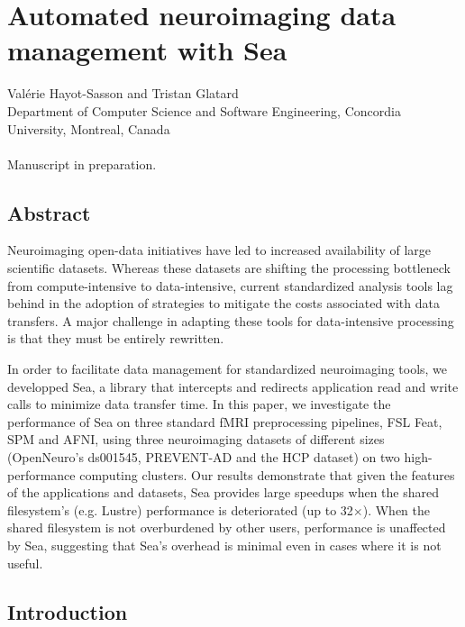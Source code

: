 \chapter{Automated neuroimaging data management with Sea}\label{chapter:sea-neuro}

Val\'erie Hayot-Sasson and Tristan Glatard \\
\begingroup \footnotesize
Department of Computer Science and Software Engineering, Concordia University, Montreal, Canada \\
\endgroup 
\vspace{5pt} \\
Manuscript in preparation. \\

\section{Abstract}

	Neuroimaging open-data initiatives have led to increased availability of large scientific datasets. 
  Whereas these datasets are shifting the processing bottleneck from compute-intensive to data-intensive,
  current standardized analysis tools lag behind in the adoption of strategies to mitigate the costs associated with
  data transfers. A major challenge in adapting these tools for data-intensive processing is that they must be entirely
  rewritten.
  
  In order to facilitate data management for standardized neuroimaging tools, we developped Sea, a library that intercepts
  and redirects application read and write calls to minimize data transfer time. In this paper, we investigate
  the performance of Sea on three standard fMRI preprocessing pipelines, FSL Feat, SPM and AFNI, using three neuroimaging datasets of different sizes
  (OpenNeuro's ds001545, PREVENT-AD and the HCP dataset) on two high-performance computing clusters. Our results demonstrate that given the features of the applications and datasets,
  Sea provides large speedups when the shared filesystem's (e.g. Lustre) performance is deteriorated (up to 32$\times$). When the shared filesystem is not overburdened by other users,
  performance is unaffected by Sea, suggesting that Sea's overhead is minimal even in cases where it is not useful.
  
  \section{Introduction}\label{sec:sea_neuro:introduction}
    
